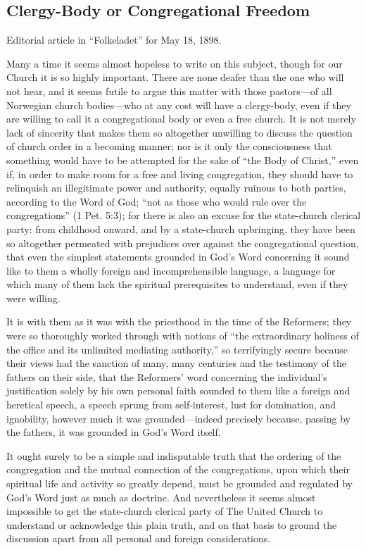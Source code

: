 
\subsection{Clergy-Body or Congregational Freedom}

Editorial article in “Folkeladet” for May 18, 1898.

Many a time it seems almost hopeless to write on this subject, though for our Church it is so highly important. There are none deafer than the one who will not hear, and it seems futile to argue this matter with those pastors—of all Norwegian church bodies—who at any cost will have a clergy-body, even if they are willing to call it a congregational body or even a free church. It is not merely lack of sincerity that makes them so altogether unwilling to discuss the question of church order in a becoming manner; nor is it only the consciousness that something would have to be attempted for the sake of “the Body of Christ,” even if, in order to make room for a free and living congregation, they should have to relinquish an illegitimate power and authority, equally ruinous to both parties, according to the Word of God; “not as those who would rule over the congregations” (1 Pet. 5:3); for there is also an excuse for the state-church clerical party: from childhood onward, and by a state-church upbringing, they have been so altogether permeated with prejudices over against the congregational question, that even the simplest statements grounded in God’s Word concerning it sound like to them a wholly foreign and incomprehensible language, a language for which many of them lack the spiritual prerequisites to understand, even if they were willing.

It is with them as it was with the priesthood in the time of the Reformers; they were so thoroughly worked through with notions of “the extraordinary holiness of the office and its unlimited mediating authority,” so terrifyingly secure because their views had the sanction of many, many centuries and the testimony of the fathers on their side, that the Reformers’ word concerning the individual’s justification solely by his own personal faith sounded to them like a foreign and heretical speech, a speech sprung from self-interest, lust for domination, and ignobility, however much it was grounded—indeed precisely because, passing by the fathers, it was grounded in God’s Word itself.

It ought surely to be a simple and indisputable truth that the ordering of the congregation and the mutual connection of the congregations, upon which their spiritual life and activity so greatly depend, must be grounded and regulated by God’s Word just as much as doctrine. And nevertheless it seems almost impossible to get the state-church clerical party of The United Church to understand or acknowledge this plain truth, and on that basis to ground the discussion apart from all personal and foreign considerations.

